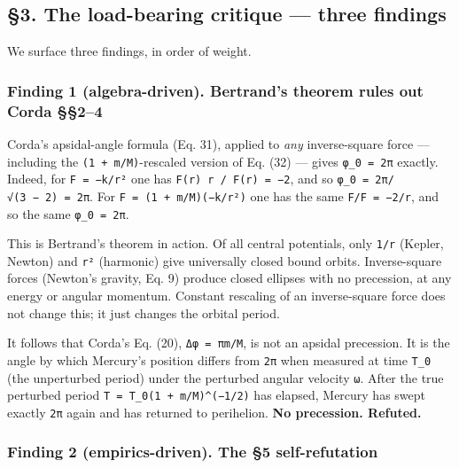 \documentclass[
  11pt,
]{article}
\begin{document}
\hypertarget{the-load-bearing-critique-three-findings}{%
\subsection{§3. The load-bearing critique --- three
findings}\label{the-load-bearing-critique-three-findings}}

We surface three findings, in order of weight.

\hypertarget{finding-1-algebra-driven.-bertrands-theorem-rules-out-corda-24}{%
\subsubsection{Finding 1 (algebra-driven). Bertrand's theorem rules out
Corda
§§2--4}\label{finding-1-algebra-driven.-bertrands-theorem-rules-out-corda-24}}

Corda's apsidal-angle formula (Eq. 31), applied to \emph{any}
inverse-square force --- including the \texttt{(1\ +\ m/M)}-rescaled
version of Eq. (32) --- gives \texttt{φ\_0\ =\ 2π} exactly. Indeed, for
\texttt{F\ =\ −k/r²} one has
\texttt{F\textquotesingle{}(r)\ r\ /\ F(r)\ =\ −2}, and so
\texttt{φ\_0\ =\ 2π/√(3\ −\ 2)\ =\ 2π}. For
\texttt{F\ =\ (1\ +\ m/M)(−k/r²)} one has the same
\texttt{F\textquotesingle{}/F\ =\ −2/r}, and so the same
\texttt{φ\_0\ =\ 2π}.

This is Bertrand's theorem in action. Of all central potentials, only
\texttt{1/r} (Kepler, Newton) and \texttt{r²} (harmonic) give
universally closed bound orbits. Inverse-square forces (Newton's
gravity, Eq. 9) produce closed ellipses with no precession, at any
energy or angular momentum. Constant rescaling of an inverse-square
force does not change this; it just changes the orbital period.

It follows that Corda's Eq. (20), \texttt{Δφ\ =\ πm/M}, is not an
apsidal precession. It is the angle by which Mercury's position differs
from \texttt{2π} when measured at time \texttt{T\_0} (the unperturbed
period) under the perturbed angular velocity \texttt{ω}. After the true
perturbed period \texttt{T\ =\ T\_0(1\ +\ m/M)\^{}(−1/2)} has elapsed,
Mercury has swept exactly \texttt{2π} again and has returned to
perihelion. \textbf{No precession. Refuted.}

\hypertarget{finding-2-empirics-driven.-the-5-self-refutation}{%
\subsubsection{Finding 2 (empirics-driven). The §5
self-refutation}\label{finding-2-empirics-driven.-the-5-self-refutation}}
\end{document}
